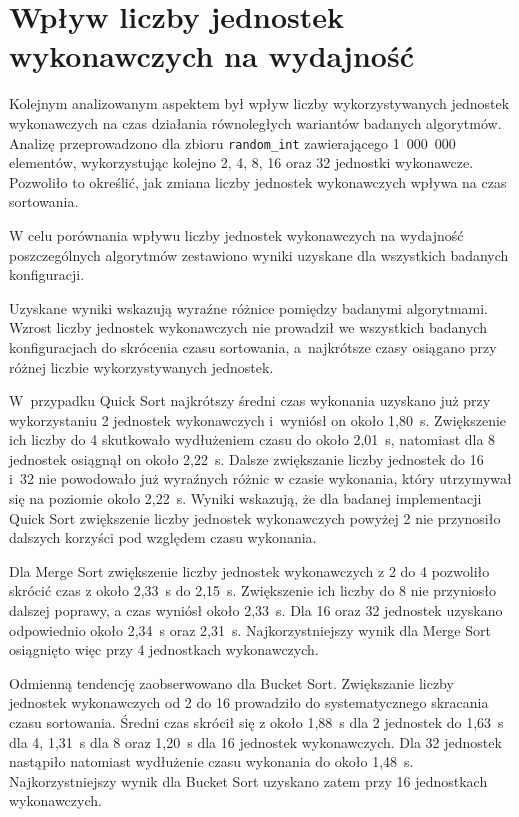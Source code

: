 \section{Wpływ liczby jednostek wykonawczych na wydajność}
\label{sec:LiczbaRdzeni}

Kolejnym analizowanym aspektem był wpływ liczby wykorzystywanych jednostek
wykonawczych na czas działania równoległych wariantów badanych algorytmów.
Analizę przeprowadzono dla zbioru \texttt{random\_int} zawierającego 1~000~000 elementów, 
wykorzystując kolejno 2, 4, 8, 16 oraz 32 jednostki wykonawcze. 
Pozwoliło to określić, jak zmiana liczby jednostek wykonawczych wpływa na czas sortowania.

W celu porównania wpływu liczby jednostek wykonawczych na wydajność poszczególnych algorytmów 
zestawiono wyniki uzyskane dla wszystkich badanych konfiguracji.



Uzyskane wyniki wskazują wyraźne różnice pomiędzy badanymi algorytmami.
Wzrost liczby jednostek wykonawczych nie prowadził we wszystkich badanych konfiguracjach do skrócenia czasu sortowania, 
a~najkrótsze czasy osiągano przy różnej liczbie wykorzystywanych jednostek.

W~przypadku Quick Sort najkrótszy średni czas wykonania uzyskano już przy wykorzystaniu 2 jednostek wykonawczych i~wyniósł on około 1,80~s.
Zwiększenie ich liczby do 4 skutkowało wydłużeniem czasu do około 2,01~s, natomiast dla 8 jednostek osiągnął on około 2,22~s. 
Dalsze zwiększanie liczby jednostek do 16 i~32 nie powodowało już wyraźnych różnic w czasie wykonania, który utrzymywał się na poziomie około 2,22~s. 
Wyniki wskazują, że dla badanej implementacji Quick Sort zwiększenie liczby jednostek wykonawczych 
powyżej 2 nie przynosiło dalszych korzyści pod względem czasu wykonania.

Dla Merge Sort zwiększenie liczby jednostek wykonawczych z 2 do 4 pozwoliło skrócić czas z około 2,33~s do 2,15~s. 
Zwiększenie ich liczby do 8 nie przyniosło dalszej poprawy, a czas wyniósł około 2,33~s.
Dla 16 oraz 32 jednostek uzyskano odpowiednio około 2,34~s oraz 2,31~s.
Najkorzystniejszy wynik dla Merge Sort osiągnięto więc przy 4 jednostkach wykonawczych.

Odmienną tendencję zaobserwowano dla Bucket Sort. 
Zwiększanie liczby jednostek wykonawczych od 2 do 16 prowadziło do systematycznego skracania czasu sortowania. 
Średni czas skrócił się z około 1,88~s dla 2 jednostek do 1,63~s dla 4, 1,31~s dla 8 oraz 1,20~s dla 16 jednostek wykonawczych. 
Dla 32 jednostek nastąpiło natomiast wydłużenie czasu wykonania do około 1,48~s.
Najkorzystniejszy wynik dla Bucket Sort uzyskano zatem przy 16 jednostkach wykonawczych.

